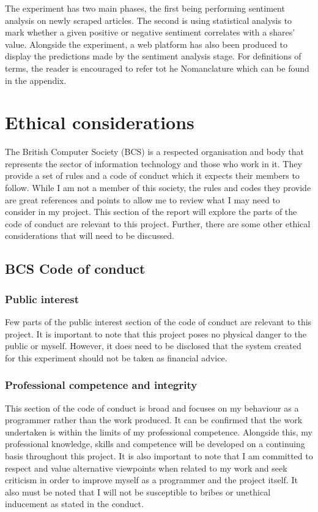 \documentclass[a4paper,11pt]{report}
\begin{document}
The experiment has two main phases, the first being performing sentiment analysis on newly scraped articles. The second is using statistical analysis to mark whether a given positive or negative sentiment correlates with a shares' value. Alongside the experiment, a web platform has also been produced to display the predictions made by the sentiment analysis stage. For definitions of terms, the reader is encouraged to refer tot he Nomanclature which can be found in the appendix.

\chapter{Ethical considerations}
\label{chap:ethical-con}
The British Computer Society (BCS) is a respected organisation and body that represents the sector of information technology and those who work in it. They provide a set of rules and a code of conduct which it expects their members to follow. While I am not a member of this society, the rules and codes they provide are great references and points to allow me to review what I may need to consider in my project. This section of the report will explore the parts of the code of conduct are relevant to this project. Further, there are some other ethical considerations that will need to be discussed.

\section{BCS Code of conduct}

\subsection{Public interest}
Few parts of the public interest section of the code of conduct are relevant to this project. It is important to note that this project poses no physical danger to the public or myself. However, it does need to be disclosed that the system created for this experiment should not be taken as financial advice.

\subsection{Professional competence and integrity}
This section of the code of conduct is broad and focuses on my behaviour as a programmer rather than the work produced. It can be confirmed that the work undertaken is within the limits of my professional competence. Alongside this, my professional knowledge, skills and competence will be developed on a continuing basis throughout this project. It is also important to note that I am committed to respect and value alternative viewpoints when related to my work and seek criticism in order to improve myself as a programmer and the project itself. It also must be noted that I will not be susceptible to bribes or unethical inducement as stated in the conduct.
\end{document}
